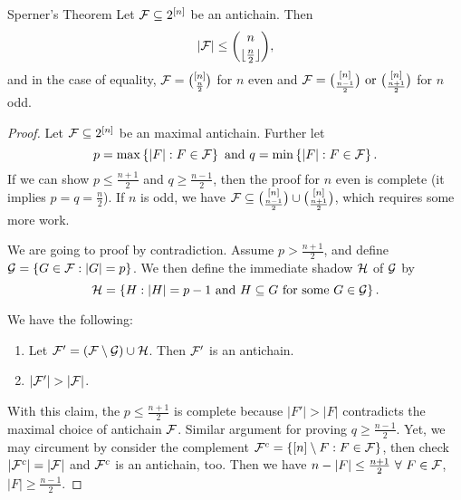 \begin{theorem}[thm:]{Sperner's Theorem}
    Let $\mathcal{F}\subseteq 2^{[n]}$ be an antichain. Then
    \[|\mathcal{F}|\leq {n\choose \lfloor \frac{n}{2}\rfloor},\]
    and in the case of equality, $\mathcal{F}={[n]\choose \frac{n}{2}}$ for $n$ even and $\mathcal{F}={[n]\choose \frac{n-1}{2}} \textnormal{ or } {[n]\choose \frac{n+1}{2}}$ for $n$ odd.
\end{theorem}

\begin{proof}
    Let $\mathcal{F}\subseteq 2^{[n]}$ be an maximal antichain. Further let
    \[p=\max\left\{\left|F\right|:F\in \mathcal{F}\right\}\textnormal{ and }q=\min\left\{\left|F\right|:F\in \mathcal{F}\right\}.\]
    If we can show $p\leq \frac{n+1}{2}$ and $q\geq \frac{n-1}{2}$, then the proof for $n$ even is complete (it implies $p=q=\frac{n}{2}$). If $n$ is odd, we have $\mathcal{F}\subseteq {[n]\choose \frac{n-1}{2}}\cup {[n]\choose \frac{n+1}{2}}$, which requires some more work.

    We are going to proof by contradiction. Assume $p>\frac{n+1}{2}$, and define $\mathcal{G}=\left\{G\in \mathcal{F}:\left|G\right|=p\right\}$.
    We then define the immediate shadow $\mathcal{H}$ of $\mathcal{G}$ by
    \[\mathcal{H}=\left\{H:\left|H\right|=p-1\textnormal{ and }H\subseteq G\textnormal{ for some }G\in \mathcal{G}\right\}.\]
    \begin{claim}{}
        We have the following:
        \begin{enumerate}
            \item Let $\mathcal{F}'=(\mathcal{F}\setminus \mathcal{G})\cup \mathcal{H}$. Then $\mathcal{F}'$ is an antichain.
            \item $\left|\FF'\right|>\left|\FF\right|$.
        \end{enumerate}
    \end{claim}
    With this claim, the $p\leq \frac{n+1}{2}$ is complete because $\left|F'\right|>\left|F\right|$ contradicts the maximal choice of antichain $\mathcal{F}$. Similar argument for proving $q\geq \frac{n-1}{2}$. Yet, we may circument by consider the complement $\mathcal{F}^c=\left\{[n]\setminus F:F\in \mathcal{F}\right\}$, then check $\left|\mathcal{F}^c\right|=\left|\mathcal{F}\right|$ and $\mathcal{F}^c$ is an antichain, too. Then we have $n-|F|\leq \frac{n+1}{2}\ \forall\ F\in \mathcal{F}$, $\left|F\right|\geq \frac{n-1}{2}$.
\end{proof}

